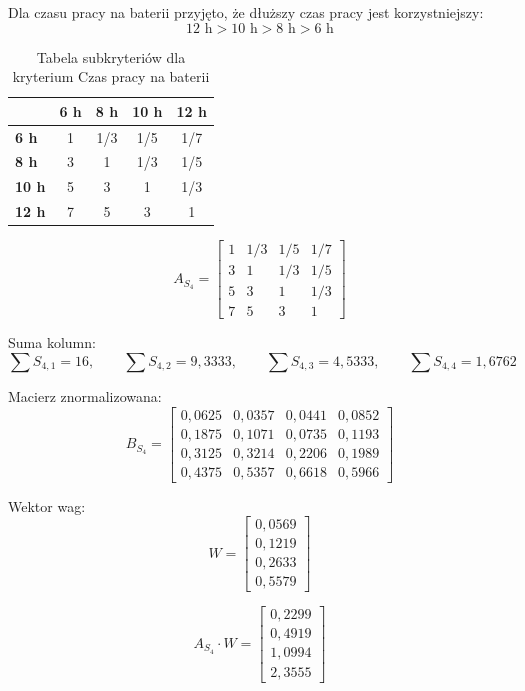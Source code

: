 \documentclass[12pt,a4paper]{article}
\begin{document}
Dla czasu pracy na baterii przyjęto, że dłuższy czas pracy jest korzystniejszy:
\[
12\text{ h} > 10\text{ h} > 8\text{ h} > 6\text{ h}
\]

\begin{table}[H]
\centering
\caption{Tabela subkryteriów dla kryterium Czas pracy na baterii}
\begin{tabular}{lcccc}
\toprule
 & \textbf{6 h} & \textbf{8 h} & \textbf{10 h} & \textbf{12 h} \\
\midrule
\textbf{6 h} & 1 & 1/3 & 1/5 & 1/7 \\
\textbf{8 h} & 3 & 1 & 1/3 & 1/5 \\
\textbf{10 h} & 5 & 3 & 1 & 1/3 \\
\textbf{12 h} & 7 & 5 & 3 & 1 \\
\bottomrule
\end{tabular}
\end{table}

\[
A_{S_4}=
\begin{bmatrix}
1 & 1/3 & 1/5 & 1/7 \\
3 & 1 & 1/3 & 1/5 \\
5 & 3 & 1 & 1/3 \\
7 & 5 & 3 & 1
\end{bmatrix}
\]

Suma kolumn:
\[
\sum S_{4,1}=16,\qquad
\sum S_{4,2}=9{,}3333,\qquad
\sum S_{4,3}=4{,}5333,\qquad
\sum S_{4,4}=1{,}6762
\]

Macierz znormalizowana:
\[
B_{S_4}=
\begin{bmatrix}
0{,}0625 & 0{,}0357 & 0{,}0441 & 0{,}0852 \\
0{,}1875 & 0{,}1071 & 0{,}0735 & 0{,}1193 \\
0{,}3125 & 0{,}3214 & 0{,}2206 & 0{,}1989 \\
0{,}4375 & 0{,}5357 & 0{,}6618 & 0{,}5966
\end{bmatrix}
\]

Wektor wag:
\[
W=
\begin{bmatrix}
0{,}0569\\
0{,}1219\\
0{,}2633\\
0{,}5579
\end{bmatrix}
\]

\[
A_{S_4}\cdot W=
\begin{bmatrix}
0{,}2299\\
0{,}4919\\
1{,}0994\\
2{,}3555
\end{bmatrix}
\]
\end{document}
